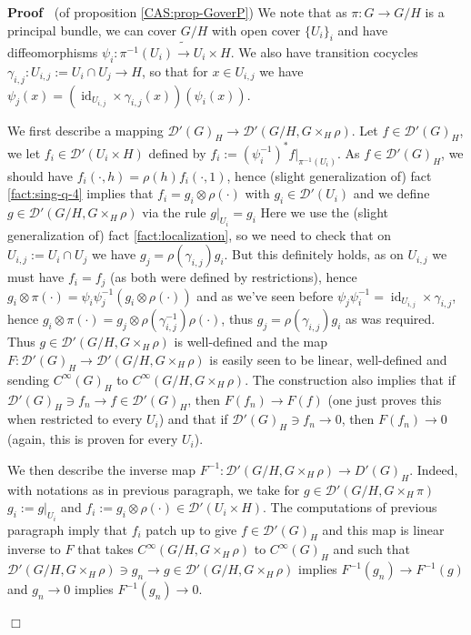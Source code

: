 \documentclass{article}
\newcommand{\assign}{:=}
\newcommand{\tmop}[1]{\ensuremath{\operatorname{#1}}}
\newenvironment{proof}{\noindent\textbf{Proof\ }}{\hspace*{\fill}$\Box$\medskip}
\begin{document}
\begin{proof}
  (of proposition \ref{CAS:prop-GoverP}) We note that as $\pi : G \rightarrow
  G / H$ is a principal bundle, we can cover $G / H$ with open cover $\{ U_i
  \}_i$ and have diffeomorphisms $\psi_i : \pi^{- 1} (U_i) \tilde{\rightarrow}
  U_i \times H$. We also have transition cocycles $\gamma_{i, j} : U_{i, j}
  \assign U_i \cap U_j \rightarrow H$, so that for $x \in U_{i, j}$ we have
  $\psi_j (x) = (\tmop{id}_{U_{i, j}} \times \gamma_{i, j} (x)) (\psi_i (x))$.
  
  We first describe a mapping $\mathcal{D}' (G)_H \rightarrow \mathcal{D}' (G
  / H, G \times_H \rho)$. Let $f \in \mathcal{D}' (G)_H$, we let $f_i \in
  \mathcal{D}' (U_i \times H)$ defined by $f_i \assign (\psi_i^{- 1})^{\ast} f
  \big|_{\pi^{- 1} (U_i)}$. As $f \in \mathcal{D}'  (G)_H$, we should have
  $f_i (\cdot, h) = \rho (h) f_i (\cdot, 1)$, hence (slight generalization of)
  fact \ref{fact:sing-q-4} implies that $f_i = g_i \otimes \rho (\cdot)$ with
  $g_i \in \mathcal{D}' (U_i)$ and we define $g \in \mathcal{D}' (G / H, G
  \times_H \rho)$ via the rule $g \big|_{U_i} = g_i$ Here we use the
  (slight generalization of) fact \ref{fact:localization}, so we need to check
  that on $U_{i, j} \assign U_i \cap U_j$ we have $g_j = \rho (\gamma_{i, j})
  g_i$. But this definitely holds, as on $U_{i, j}$ we must have $f_i = f_j$
  (as both were defined by restrictions), hence $g_i \otimes \pi (\cdot) =
  \psi_i \psi_j^{- 1} (g_i \otimes \rho (\cdot))$ and as we've seen before
  $\psi_j \psi_i^{- 1} = \tmop{id}_{U_{i, j}} \times \gamma_{i, j}$, hence
  $g_i \otimes \pi (\cdot) = g_j \otimes \rho (\gamma_{i, j}^{- 1}) \rho
  (\cdot)$, thus $g_j = \rho (\gamma_{i, j}) g_i$ as was required. Thus $g \in
  \mathcal{D}' (G / H, G \times_H \rho)$ is well-defined and the map $F :
  \mathcal{D}' (G)_H \rightarrow \mathcal{D}' (G / H, G \times_H \rho)$ is
  easily seen to be linear, well-defined and sending $C^{\infty} (G)_H$ to
  $C^{\infty} (G / H, G \times_H \rho)$. The construction also implies that if
  $\mathcal{D}' (G)_H \ni f_n \rightarrow f \in \mathcal{D}' (G)_H$, then $F
  (f_n) \rightarrow F (f)$ (one just proves this when restricted to every
  $U_i$) and that if $\mathcal{D}' (G)_H \ni f_n \rightarrow 0$, then $F (f_n)
  \rightarrow 0$ (again, this is proven for every $U_i$).
  
  We then describe the inverse map $F^{- 1} : \mathcal{D}' (G / H, G \times_H
  \rho) \rightarrow D'  (G)_H$. Indeed, with notations as in previous
  paragraph, we take for $g \in \mathcal{D}' (G / H, G \times_H \pi)$ $g_i
  \assign g \big|_{U_i}$ and $f_i \assign g_i \otimes \rho (\cdot) \in
  \mathcal{D}' (U_i \times H)$. The computations of previous paragraph imply
  that $f_i$ patch up to give $f \in \mathcal{D}' (G)_H$ and this map is
  linear inverse to $F$ that takes $C^{\infty} (G / H, G \times_H \rho)$ to
  $C^{\infty} (G)_H$ and such that $\mathcal{D}' (G / H, G \times_H \rho) \ni
  g_n \rightarrow g \in \mathcal{D}' (G / H, G \times_H \rho)$ implies $F^{-
  1} (g_n) \rightarrow F^{- 1} (g)$ and $g_n \rightarrow 0$ implies $F^{- 1}
  (g_n) \rightarrow 0$.
  

\end{proof}
\end{document}
